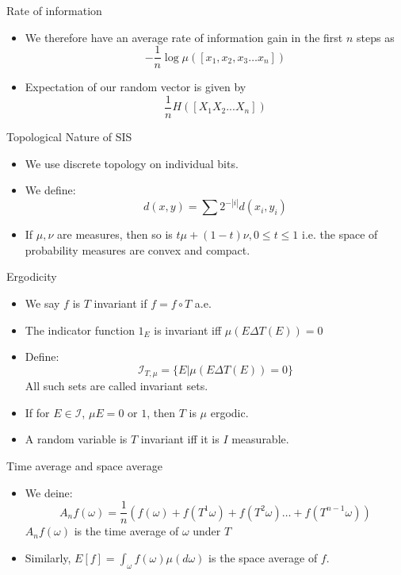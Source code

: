 \begin{frame}{Rate of information}
    \begin{itemize}[$\bullet$]
        \item We therefore have an average rate of information gain in the first $n$ steps as 
        $$-\frac{1}{n}\log\mu([x_1,x_2,x_3\hdots x_n])$$
        \item Expectation of our random vector is given by
        $$\frac{1}{n}H([X_1X_2...X_n])$$
    \end{itemize}
\end{frame}

\begin{frame}{Topological Nature of SIS}
    \begin{itemize}[$\bullet$]
        \item We use discrete topology on individual bits.
        \item We define:
        $$d(x,y)=\sum 2^{-|i|}d(x_i,y_i)$$
        \item If $\mu,\nu$ are measures, then so is $t\mu+(1-t)\nu,0\leq t\leq 1$ i.e. the space of probability measures are convex and compact. 
    \end{itemize}
\end{frame}


\begin{frame}{Ergodicity}
    \begin{itemize}[$\bullet$]
        \item We say $f$ is $T$ invariant if $f=f\circ T$ a.e.
        \item The indicator function $1_E$ is invariant  iff $\mu(E\Delta T(E))=0$
        \item Define:
        $$\mathcal I_{T,\mu}=\{E|\mu(E\Delta T(E))=0\}$$
        All such sets are called invariant sets.
        \item If for $E\in \mathcal I$, $\mu E=0$ or $1$, then $T$ is $\mu$ ergodic.
        \item A random variable is $T$ invariant iff it is $I$ measurable.
    \end{itemize}
\end{frame}

\begin{frame}{Time average and space average}
\begin{itemize}[$\bullet$]
    \item We deine:
    $$A_nf(\omega)=\frac{1}{n}\left(f(\omega)+f(T^{1}\omega)+f(T^{2}\omega)\hdots +f(T^{n-1}\omega)\right)$$
    $A_n f(\omega)$ is the time average of $\omega$ under $T$ 
    \item Similarly, $E[f]=\int_{\omega}f(\omega)\mu(d\omega)$ is the space average of $f$.
\end{itemize}
\end{frame}

